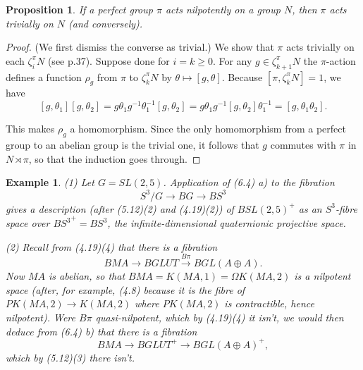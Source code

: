 \documentclass[openany,leqno]{book}  %
\newtheorem{prop}[theorem]{Proposition}
\newtheorem{ex}[theorem]{Example}
\begin{document}
\begin{prop}
 	If a perfect group $\pi$ acts nilpotently on a group $N$, then $\pi$ acts trivially on $N$ (and conversely).
 \end{prop} 
\begin{proof}
 (We first dismiss the converse as trivial.) We show that $\pi$ acts trivially on each $\zeta_i^\pi N$ (see p.37). Suppose done for $i = k \geqslant 0$. For any $g\in \zeta_{k+1}^\pi N$ the $\pi$-action defines a function $\rho_g$ from $\pi$ to $\zeta_{k}^\pi N$ by $\theta \mapsto [g, \theta ]$. Because $[\pi,\zeta_{k}^\pi N ]= 1$, we have
 \[[g,\theta_1][g,\theta_2] =g\theta_1g^{-1}\theta_1^{-1}[g,\theta_2]=g\theta_1g^{-1}[g,\theta_2]\theta_1^{-1}=[g,\theta_1 \theta_2].\]

This makes $\rho_g$ a homomorphism. Since the only homomorphism from a perfect group to an abelian group is the trivial one, it follows that $g$ commutes with $\pi$ in $N \rtimes \pi$, so that the induction goes through.
 \end{proof}
  \begin{ex}
  	(1) Let $G = SL(2, 5)$. Application of (6.4) a) to the fibration 
\[S^3/G \rightarrow BG \rightarrow BS^3\]
gives a description (after (5.12)(2) and (4.19)(2)) of $BSL(2, 5)^+$ as an $S^3$-fibre space over ${BS^3}^+ = BS^3$, the infinite-dimensional quaternionic projective space. 

(2) Recall from (4.19)(4) that there is a fibration
\[BMA \longrightarrow BGLUT \overset{B\pi}{\longrightarrow}  BGL(A\oplus A).\]
Now $MA$ is abelian, so that $BMA = K(MA, 1) = \Omega K(MA, 2)$ is a nilpotent space (after, for example, (4.8) because it is the fibre of $PK(MA, 2) \longrightarrow K(MA, 2)$ where $PK(MA, 2)$ is contractible, hence nilpotent). Were $B\pi$ quasi-nilpotent, which by (4.19)(4) it isn't, we would then deduce from (6.4) b) that there is a fibration
\[BMA \longrightarrow BGLUT^+ \longrightarrow  BGL(A\oplus A)^+,\]
which by (5.12)(3) there isn't.
  \end{ex}
\end{document}

